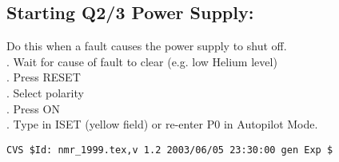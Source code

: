 \subsection{Starting Q2/3 Power Supply:}
\noindent Do this when a fault causes the power supply to shut off.\\
. Wait for cause of fault to clear (e.g. low Helium level)\\
. Press RESET\\
. Select polarity\\
. Press ON\\
. Type in ISET (yellow field) or re-enter P0 in Autopilot Mode.\\

%
%
{\small
\begin{verbatim}CVS $Id: nmr_1999.tex,v 1.2 2003/06/05 23:30:00 gen Exp $\end{verbatim}
}
